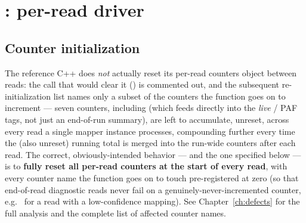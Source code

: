 \section{: per-read driver}
\label{sec:map-read}

\subsection{Counter initialization}
\label{sec:map-read-counters}

\begin{bugbox}
The reference C++ does \emph{not} actually reset its per-read counters object between reads: the
call that would clear it () is commented out, and the subsequent
re-initialization list names only a subset of the counters the function goes on to increment ---
seven counters, including  (which feeds directly into the \emph{live}
/ PAF tags, not just an end-of-run summary),
are left to accumulate, unreset, across every read a single mapper instance processes, compounding
further every time the (also unreset) running total is merged into the run-wide counters after
each read. The correct, obviously-intended behavior --- and the one specified below --- is to
\textbf{fully reset all per-read counters at the start of every read}, with every counter name the
function goes on to touch pre-registered at zero (so that end-of-read diagnostic reads never fail
on a genuinely-never-incremented counter, e.g.\  for a read with a low-confidence
mapping). See Chapter~\ref{ch:defects} for the full analysis and the complete list of affected
counter names.
\end{bugbox}

